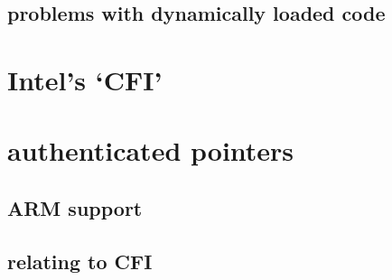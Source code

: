 \subsection{problems with dynamically loaded code}


\section{Intel's `CFI'}


\section{authenticated pointers}

\subsection{ARM support}

\subsection{relating to CFI}


